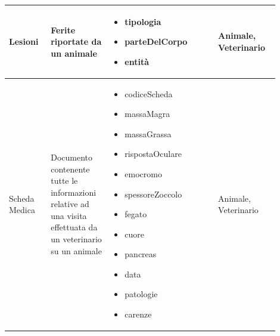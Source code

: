 \documentclass[12pt,a4paper]{article}
\begin{document}
\begin{center}
\begin{longtable}{|p{0.14\linewidth}|p{0.20\linewidth}|p{0.36\linewidth}|p{0.20\linewidth}|}
\hline
Lesioni				 	& \begin{flushleft}\vspace{-25pt} Ferite riportate da un animale \end{flushleft}
					& \begin{itemize}
						\setlength{\itemindent}{-1em}
						\vspace{-25pt}
						\setlength\itemsep{-0.25em}
						\item tipologia
						\item parteDelCorpo
						\item entità
					\end{itemize}
					& \begin{flushleft}\vspace{-25pt} Animale, Veterinario \end{flushleft} \\ 

\hline
Scheda Medica				 	& \begin{flushleft}\vspace{-25pt} Documento contenente tutte le informazioni relative ad una visita effettuata da un veterinario su un animale \end{flushleft}
					& \begin{itemize}
						\setlength{\itemindent}{-1em}
						\vspace{-25pt}
						\setlength\itemsep{-0.25em}
						\item codiceScheda
						\item massaMagra
						\item massaGrassa
						\item rispostaOculare
						\item emocromo
						\item spessoreZoccolo
						\item fegato
						\item cuore
						\item pancreas
						\item data
						\item patologie
						\item carenze
						
						
					\end{itemize}
					& \begin{flushleft}\vspace{-25pt} Animale, Veterinario \end{flushleft} \\ 


\end{longtable}
\end{center}
\end{document}
